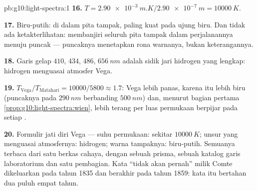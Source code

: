 \begin{solution}{pb:g10:light-spectra:1}
\textbf{16.} $T = \qty{2.90e-3}{m.K} / \qty{2.90e-7}{m}
= \qty{10000}{K}$.

\textbf{17.} Biru-putih: di dalam pita tampak,  paling kuat
pada ujung biru. Dan tidak ada ketakterlihatan: 
membanjiri seluruh pita tampak dalam perjalanannya menuju puncak
 --- puncaknya menetapkan rona warnanya, bukan
keterangannya.

\textbf{18.} Garis gelap $410$, $434$, $486$, $\qty{656}{nm}$ adalah
sidik jari hidrogen yang lengkap: hidrogen menguasai atmosfer Vega.

\textbf{19.} $T_{\text{Vega}} / T_{\text{Matahari}} = 10000 / 5800 \approx
1.7$: Vega lebih panas, karena itu lebih biru (puncaknya pada
$\qty{290}{nm}$ berbanding $\qty{500}{nm}$) dan, menurut bagian pertama
\cref{prop:g10:light-spectra:wien}, lebih terang per  luas
permukaan berpijar pada setiap .

\textbf{20.} Formulir jati diri Vega --- suhu permukaan: sekitar
$\qty{10000}{K}$; unsur yang menguasai atmosfernya: hidrogen; warna
tampaknya: biru-putih. Semuanya terbaca dari satu berkas cahaya, dengan
sebuah prisma, sebuah katalog garis laboratorium dan satu pembagian.
Kata ``tidak akan pernah'' milik Comte dikeluarkan pada tahun 1835 dan
berakhir pada tahun 1859: kata itu bertahan dua puluh empat tahun.
\end{solution}
